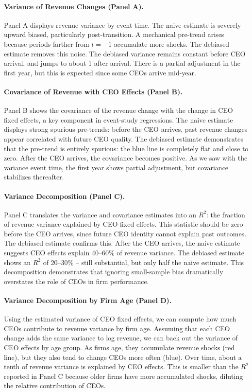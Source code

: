 \documentclass[11pt,a4paper]{article}
\begin{document}
\paragraph{Variance of Revenue Changes (Panel A).} Panel A displays revenue variance by event time. The naive estimate is severely upward biased, particularly post-transition. A mechanical pre-trend arises because periods farther from $t=-1$ accumulate more shocks. The debiased estimate removes this noise. The debiased variance remains constant before CEO arrival, and jumps to about 1 after arrival. There is a partial adjustment in the first year, but this is expected since some CEOs arrive mid-year. 

\paragraph{Covariance of Revenue with CEO Effects (Panel B).} Panel B shows the covariance of the revenue change with the change in CEO fixed effects, a key component in event-study regressions. The naive estimate displays strong spurious pre-trends: before the CEO arrives, past revenue changes appear correlated with future CEO quality. The debiased estimate demonstrates that the pre-trend is entirely spurious: the blue line is completely flat and close to zero. After the CEO arrives, the covariance becomes positive. As we saw with the variance event time, the first year shows partial adjustment, but covariance stabilizes thereafter.

\paragraph{Variance Decomposition (Panel C).} Panel C translates the variance and covariance estimates into an $R^2$: the fraction of revenue variance explained by CEO fixed effects. This statistic should be zero before the CEO arrives, since future CEO identity cannot explain past outcomes. The debiased estimate confirms this. After the CEO arrives, the naive estimate suggests CEO effects explain 40--60\% of revenue variance. The debiased estimate shows an $R^2$ of 20--30\% -- still substantial, but only half the naive estimate. This decomposition demonstrates that ignoring small-sample bias dramatically overstates the role of CEOs in firm performance.

\paragraph{Variance Decomposition by Firm Age (Panel D).} Using the estimated variance of CEO fixed effects, we can compute how much CEOs contribute to revenue variance by firm age. Assuming that each CEO change adds the same variance to log revenue, we can back out the variance of CEO effects by age group. As firms age, they accumulate revenue shocks (red line), but they also tend to change CEOs more often (blue). Over time, about a tenth of revenue variance is explained by CEO effects. This is smaller than the $R^2$ reported in Panel C because older firms have more accumulated shocks, diluting the relative contribution of CEOs.
\end{document}
